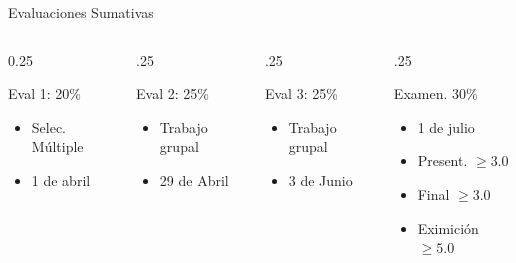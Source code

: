 \documentclass[11pt, aspectratio=169, xcolor=table]{beamer}
\begin{document}
	\begin{frame}{Evaluaciones Sumativas}
		\begin{columns}
			\begin{column}{0.25\linewidth}
				\begin{block}{Eval 1: 20\%}
					\begin{itemize}
						\item Selec. Múltiple
						\item 1 de abril
					\end{itemize}
				\end{block}
			\end{column}
			\begin{column}{.25\linewidth}
				\begin{block}{Eval 2: 25\%}
					\begin{itemize}
						\item Trabajo grupal
						\item 29 de Abril
					\end{itemize}
				\end{block}
			\end{column}
			\begin{column}{.25\linewidth}
				\begin{block}{Eval 3: 25\%}
					\begin{itemize}
						\item Trabajo grupal
						\item 3 de Junio
					\end{itemize}
				\end{block}
			\end{column}
			\begin{column}{.25\linewidth}
				\begin{block}{Examen. 30\%}
					\begin{itemize}
                      \item 1 de julio
                      \item Present. $\geqslant 3.0$
                      \item Final $\geqslant 3.0$
                      \item Eximición $\geqslant 5.0$ 
					\end{itemize}
				\end{block}
			\end{column}
		\end{columns}
	\end{frame}
\end{document}
